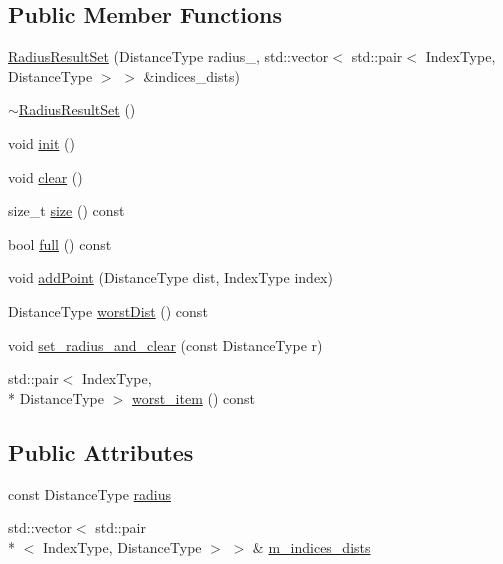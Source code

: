 \subsection*{Public Member Functions}
\begin{DoxyCompactItemize}
\item 
\hyperlink{classnanoflann_1_1_radius_result_set_a6266e067f0d07d09e82abf03e86f5499}{Radius\-Result\-Set} (Distance\-Type radius\-\_\-, std\-::vector$<$ std\-::pair$<$ Index\-Type, Distance\-Type $>$ $>$ \&indices\-\_\-dists)
\item 
\hyperlink{classnanoflann_1_1_radius_result_set_ae2f2b93fdb56158103d449feaedd447e}{$\sim$\-Radius\-Result\-Set} ()
\item 
void \hyperlink{classnanoflann_1_1_radius_result_set_a13a01f6272c4bd514685492437043ff0}{init} ()
\item 
void \hyperlink{classnanoflann_1_1_radius_result_set_a7f59f3258109dd732548af586aff90a9}{clear} ()
\item 
size\-\_\-t \hyperlink{classnanoflann_1_1_radius_result_set_ac004b45b09d53150d46d6f837060b1c1}{size} () const 
\item 
bool \hyperlink{classnanoflann_1_1_radius_result_set_a4363b215fe1cf27bd2d0a16015086f34}{full} () const 
\item 
void \hyperlink{classnanoflann_1_1_radius_result_set_a1f07f76ae2870d752155376846c05023}{add\-Point} (Distance\-Type dist, Index\-Type index)
\item 
Distance\-Type \hyperlink{classnanoflann_1_1_radius_result_set_ae1978e17100321887e1cf7ef1de9621a}{worst\-Dist} () const 
\item 
void \hyperlink{classnanoflann_1_1_radius_result_set_ab9a7db08f60af2a5febe1f1a31d39208}{set\-\_\-radius\-\_\-and\-\_\-clear} (const Distance\-Type r)
\item 
std\-::pair$<$ Index\-Type, \\*
Distance\-Type $>$ \hyperlink{classnanoflann_1_1_radius_result_set_a35072d6fe672b6c717a20630a422bce1}{worst\-\_\-item} () const 
\end{DoxyCompactItemize}
\subsection*{Public Attributes}
\begin{DoxyCompactItemize}
\item 
const Distance\-Type \hyperlink{classnanoflann_1_1_radius_result_set_a427684c7ff35ce0bf50075a5cc062d42}{radius}
\item 
std\-::vector$<$ std\-::pair\\*
$<$ Index\-Type, Distance\-Type $>$ $>$ \& \hyperlink{classnanoflann_1_1_radius_result_set_a88e8929d22445f82691a4d87969d4b99}{m\-\_\-indices\-\_\-dists}
\end{DoxyCompactItemize}


